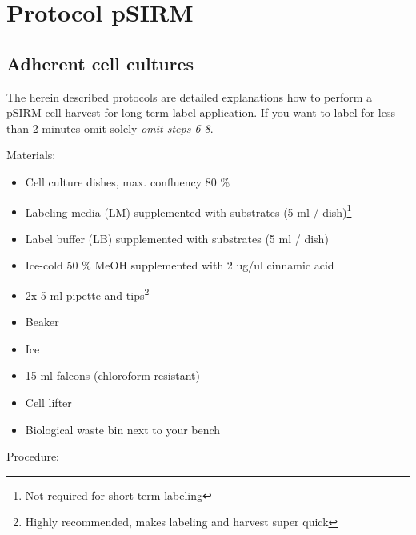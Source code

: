 \documentclass[]{book}
\providecommand{\tightlist}{%
  \setlength{\itemsep}{0pt}\setlength{\parskip}{0pt}}
\let\rmarkdownfootnote\footnote%
\def\footnote{\protect\rmarkdownfootnote}
\begin{document}
\hypertarget{protocol-psirm}{%
\section{Protocol pSIRM}\label{protocol-psirm}}

\hypertarget{psirm:adherent}{%
\subsection{Adherent cell cultures}\label{psirm:adherent}}

The herein described protocols are detailed explanations how to perform a pSIRM cell harvest for long term label application.
If you want to label for less than 2 minutes omit solely \emph{omit steps 6-8}.

Materials:

\begin{itemize}
\tightlist
\item
  Cell culture dishes, max. confluency 80 \%
\item
  Labeling media (LM) supplemented with substrates (5 ml / dish)\footnote{Not required for short term labeling}
\item
  Label buffer (LB) supplemented with substrates (5 ml / dish)
\item
  Ice-cold 50 \% MeOH supplemented with 2 ug/ul cinnamic acid
\item
  2x 5 ml pipette and tips\footnote{Highly recommended, makes labeling and harvest super quick}
\item
  Beaker
\item
  Ice
\item
  15 ml falcons (chloroform resistant)
\item
  Cell lifter
\item
  Biological waste bin next to your bench
\end{itemize}

Procedure:
\end{document}
